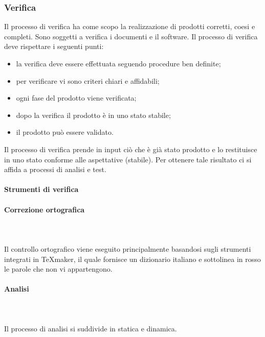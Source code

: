 \subsubsection{Verifica}
Il processo di verifica ha come scopo la realizzazione di prodotti corretti, coesi e completi. Sono soggetti a verifica i documenti e il software.
Il processo di verifica deve rispettare i seguenti punti: \begin{itemize}
\item la verifica deve essere effettuata seguendo procedure ben definite;
\item per verificare vi sono criteri chiari e affidabili;
\item ogni fase del prodotto viene verificata;
\item dopo la verifica il prodotto è in uno stato stabile;
\item il prodotto può essere validato.
\end{itemize}
Il processo di verifica prende in input ciò che è già stato prodotto e lo restituisce in uno stato
conforme alle aspettative (stabile). Per ottenere tale risultato ci si affida a processi di analisi e test.
\paragraph{Strumenti di verifica}

\paragraph*{Correzione ortografica} \mbox{} \\ \mbox{} \\
Il controllo ortografico viene eseguito principalmente basandosi sugli strumenti integrati in \TeX{}maker, il quale fornisce un dizionario italiano e sottolinea in rosso le parole che non vi appartengono. 

\paragraph{Analisi} \mbox{} \\ \mbox{} \\
Il processo di analisi si suddivide in statica e dinamica.

